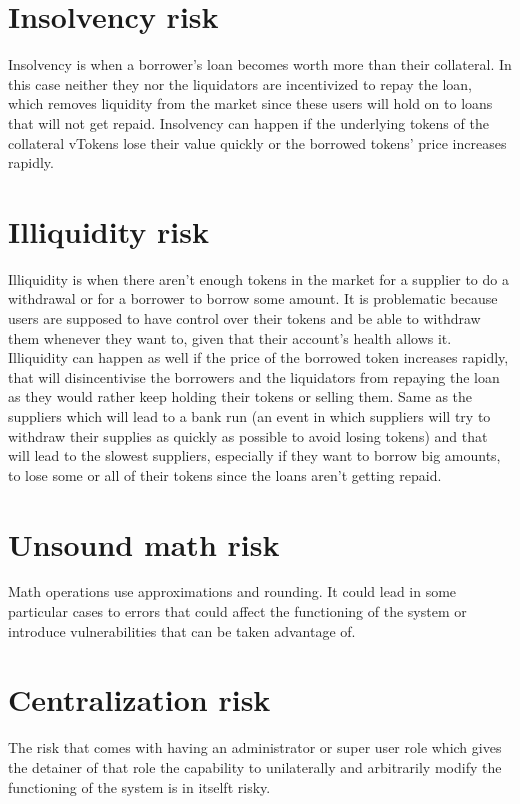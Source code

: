 
\section{Insolvency risk} %

Insolvency is when a borrower's loan becomes worth more than their collateral. In this case neither they nor the liquidators are incentivized to repay the loan, which removes liquidity from the market since these users will hold on to loans that will not get repaid. Insolvency can happen if the underlying tokens of the collateral vTokens lose their value quickly or the borrowed tokens' price increases rapidly.

\section{Illiquidity risk} %

Illiquidity is when there aren't enough tokens in the market for a supplier to do a withdrawal or for a borrower to borrow some amount. It is problematic because users are supposed to have control over their tokens and be able to withdraw them whenever they want to, given that their account's health allows it. Illiquidity can happen as well if the price of the borrowed token increases rapidly, that will disincentivise the borrowers and the liquidators from repaying the loan as they would rather keep holding their tokens or selling them. Same as the suppliers which will lead to a bank run (an event in which suppliers will try to withdraw their supplies as quickly as possible to avoid losing tokens) and that will lead to the slowest suppliers, especially if they want to borrow big amounts, to lose some or all of their tokens since the loans aren't getting repaid.

\section{Unsound math risk}

Math operations use approximations and rounding. It could lead in some particular cases to errors that could affect the functioning of the system or introduce vulnerabilities that can be taken advantage of. %

\section{Centralization risk} %

The risk that comes with having an administrator or super user role which gives the detainer of that role the capability to unilaterally and arbitrarily modify the functioning of the system is in itselft risky.

